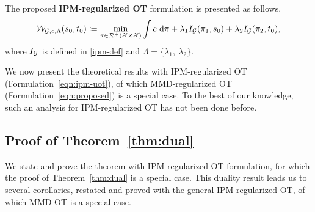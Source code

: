 \begin{definitionBoxIntro}
The proposed \textbf{IPM-regularized OT} formulation is presented as follows.
\begin{align}\label{eqn:ipm-uot}
\mathcal{W}_{\mathcal{G}, c, \Lambda}(s_0, t_0)\coloneqq \min \limits_{\pi\in\mathcal{R}^+\left(\mathcal{X}\times\mathcal{X}\right)} \int c ~\textup{d}\pi + \lambda_1  I_{\mathcal{G}}(\pi_1, s_0) + \lambda_2  I_{\mathcal{G}}(\pi_2,t_0),
\end{align}
where $ I_{\mathcal{G}}$ is defined in \ref{ipm-def} and $\Lambda=\{\lambda_1, \ \lambda_2\}$.
\end{definitionBoxIntro}

We now present the theoretical results with IPM-regularized OT (Formulation~\ref{eqn:ipm-uot}), of which MMD-regularized OT (Formulation~\ref{eqn:proposed}) is a special case. To the best of our knowledge, such an analysis for IPM-regularized OT has not been done before.
\subsection[Deriving the Dual of MMD-OT]{Proof of Theorem~\ref{thm:dual}}\label{proof:thm-dual}
We state and prove the theorem with IPM-regularized OT formulation, for which the proof of Theorem~\ref{thm:dual} is a special case. This duality result leads us to several corollaries, restated and proved with the general IPM-regularized OT, of which MMD-OT is a special case.


